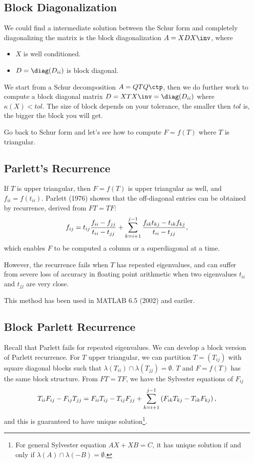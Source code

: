\documentclass{article}
\begin{document}
\subsection{Block Diagonalization}
We could find a intermediate solution between the Schur form and
completely diagonalizing the matrix is the block diagonalization $A =
XDX\inv$, where 
\begin{itemize}
    \item $X$ is well conditioned.
    \item $D = \diag(D_{ii})$ is block diagonal.
\end{itemize}
We start from a Schur decomposition $A = QTQ\ctp$, then we do further
work to compute a block diagonal matrix $D = XTX\inv = \diag(D_{ii})$
where $\kappa(X) < tol$. The size of block depends on your tolerance,
the smaller then $tol$ is, the bigger the block you will get.

\begin{mybox}
    {} Go back to Schur form and let's see how to compute $F = f(T)$
    where $T$ is triangular.
\end{mybox}

\subsection{Parlett's Recurrence}
If $T$ is upper triangular, then $F = f(T)$ is upper triangular as well,
and $f_{ii} = f(t_{ii})$. Parlett (1976) showes that the off-diagonal
entries can be obtained by recurrence, derived from $FT = TF$:
\begin{equation}\notag
    f_{ij} = t_{ij} \frac{f_{ii} - f_{jj}}{t_{ii} - t_{jj}} + 
    \sum_{k=i+1}^{j-1} \frac{f_{ik}t_{kj}-t_{ik}f_{kj}}{t_{ii}-t_{jj}},
\end{equation}
which enables $F$ to be computed a column or a superdiagonal at a time.

However, the recurrence fails when $T$ has repeated eigenvalues, and can
suffer from severe loss of accuracy in floating point arithmetic when
two eigenvalues $t_{ii}$ and $t_{jj}$ are very close. 

This method has been used in MATLAB 6.5 (2002) and eariler.

\subsection{Block Parlett Recurrence}\label{sec.bpr}

Recall that Parlett fails for repeated eigenvalues. We can develop a
block version of Parlett recurrence. For $T$ upper triangular, we can
partition $T = (T_{ij})$ with square diagonal blocks such that
$\lambda(T_{ii}) \cap \lambda(T_{jj}) = \emptyset$. $T$ and $F = f(T)$
has the same block structure. From $FT = TF$, we have the Sylvester
equations of $F_{ij}$
\begin{equation}\notag
    T_{i i} F_{i j}-F_{i j} T_{j j}=F_{i i} T_{i j}-T_{i j} F_{j j}+\sum_{k=i+1}^{j-1}\left(F_{i k} T_{k j}-T_{i k} F_{k j}\right),
\end{equation}
and this is guaranteed to have unique solution\footnote{For general
Sylvester equation $AX + XB = C$, it has unique solution if and only if
$\lambda(A)\cap \lambda(-B) = \emptyset$.}.
\end{document}
